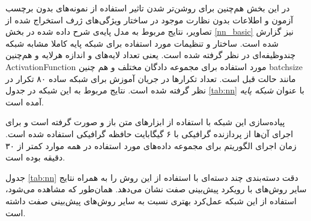 در این بخش هم‌چنین برای روشن‌تر شدن تاثیر استفاده از نمونه‌های بدون برچسب آزمون و اطلاعات بدون نظارت موجود در ساختار ویژگی‌های ژرف استخراج شده از تصاویر، نتایج مربوط به مدل پایه‌ی شرح داده شده در بخش
\ref{nn_basic}
نیز گزارش شده است. ساختار و تنظیمات مورد استفاده برای شبکه  پایه کاملا مشابه شبکه چندوظیفه‌ای در نظر گرفته شده است. یعنی تعداد لایه‌های و اندازه هرلایه و هم‌چنین
\gls{ActivationFunction}
مورد استفاده برای مجموعه دادگان مختلف و هم چنین
\gls{batchsize}
مانند حالت قبل است. تعداد تکرارها در جریان آموزش برای شبکه ساده ۸۰ تکرار در نظر گرفته شده است. نتایج مربوط به این شبکه در جدول \ref{tab:nn} با عنوان
\textit{ شبکه پایه}
آمده است.


 پیاده‌سازی این شبکه با استفاده از ابزارهای متن باز
 \cite{theano}
و
  \cite{keras}
صورت گرفته است و برای اجرای آن‌ها از پردازنده گرافیکی
با ۶ گیگابایت حافظه گرافیکی
استفاده شده است.
 زمان اجرای الگوریتم برای مجموعه داده‌های مورد استفاده در همه موارد کمتر از ۳۰ دقیقه بوده است.


جدول \ref{tab:nn} دقت دسته‌بندی چند دسته‌ای با استفاده از این روش را به همراه نتایج سایر روش‌های با رویکرد پیش‌بینی صفت نشان می‌دهد. همان‌طور که مشاهده می‌شود، استفاده از این شبکه عمل‌کرد بهتری نسبت به سایر روش‌های پیش‌بینی صفت داشته است.
